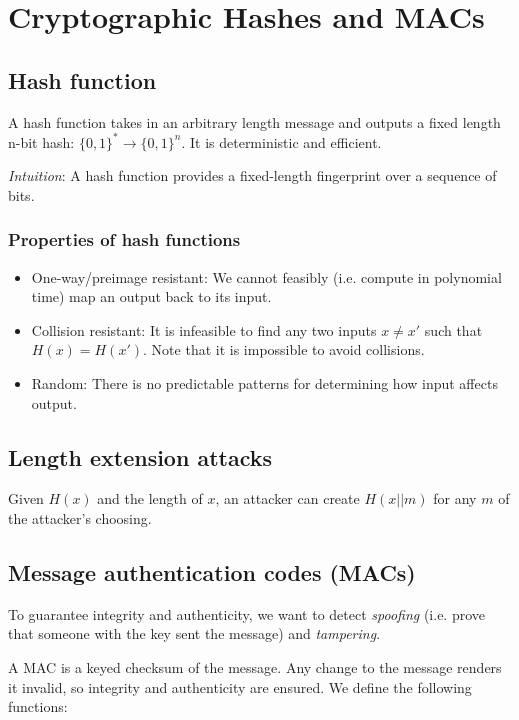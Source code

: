 \chapter{Cryptographic Hashes and MACs}

\section{Hash function}
A hash function takes in an arbitrary length message and outputs a fixed length n-bit hash: $\{0, 1\}^* \rightarrow \{0, 1\}^n$. It is deterministic and efficient.

\medskip
 
\emph{Intuition}: A hash function provides a fixed-length fingerprint over a sequence of bits.
 
\subsection{Properties of hash functions}
 \begin{itemize}
     \item One-way/preimage resistant: We cannot feasibly (i.e. compute in polynomial time) map an output back to its input.
     \item Collision resistant: It is infeasible to find any two inputs $x \neq x'$ such that $H(x) = H(x')$. Note that it is impossible to avoid collisions.
     \item Random: There is no predictable patterns for determining how input affects output.
 \end{itemize}
 
 \section{Length extension attacks}
 Given $H(x)$ and the length of $x$, an attacker can create $H(x||m)$ for any $m$ of the attacker's choosing.
 
\section{Message authentication codes (MACs)}
To guarantee integrity and authenticity, we want to detect \emph{spoofing} (i.e. prove that someone with the key sent the message) and \emph{tampering}. 

\medskip

A MAC is a keyed checksum of the message. Any change to the message renders it invalid, so integrity and authenticity are ensured. We define the following functions:

